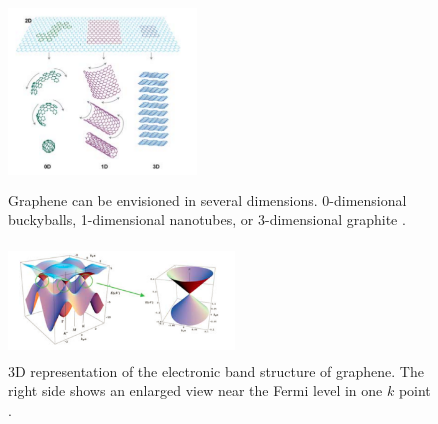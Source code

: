 \documentclass[%
 reprint,
 amsmath,amssymb,
 aps,
pra,
]{revtex4-1}
\begin{document}
\begin{figure}
\includegraphics[height=5cm, width=5cm]{../figs/multiDimGraphene}
\caption{Graphene can be envisioned in several dimensions. 0-dimensional buckyballs, 1-dimensional nanotubes, or 3-dimensional graphite \cite{Novoselov2007}.}
\label{fig:sp2}
\end{figure}



\begin{figure}
\includegraphics[height=3cm, width=6cm]{../figs/grapheneBandGap}
\caption{3D representation of the electronic band structure of graphene. The right side shows an enlarged view near the Fermi level in one $k$ point \cite{nanoscaleReview2011}.}
\label{fig:grapheneBands}
\end{figure}
\end{document}
